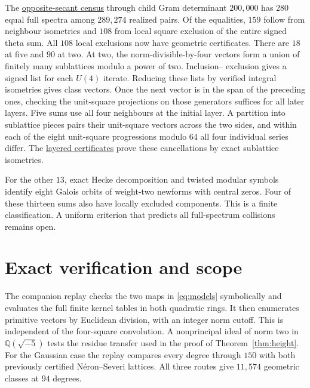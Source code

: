 \documentclass[11pt,letterpaper]{amsart}
\theoremstyle{definition}
\numberwithin{equation}{section}
\newcommand{\Q}{\mathbb Q}
\begin{document}
The \href{https://github.com/towre676-cloud/crest-root-calculus/blob/main/research/elliptic-quotients/opposite-secant-spectra/delay/README.md}{opposite-secant census}
through child Gram determinant \(200{,}000\) has \(280\) equal full
spectra among \(289{,}274\) realized pairs. Of the equalities,
\(159\) follow from neighbour isometries and \(108\) from local
square exclusion of the entire signed theta sum. All \(108\) local
exclusions now have geometric certificates. There are \(18\) at five
and \(90\) at two. At two, the norm-divisible-by-four vectors form a
union of finitely many sublattices modulo a power of two. Inclusion--
exclusion gives a signed list for each \(U(4)\) iterate. Reducing these
lists by verified integral isometries gives class vectors. Once the
next vector is in the span of the preceding ones, checking the
unit-square projections on those generators suffices for all later
layers. Five sums use all four neighbours at the initial layer. A
partition into sublattice pieces pairs their unit-square vectors
across the two sides, and within each of the eight unit-square
progressions modulo \(64\) all four individual series differ.
The \href{https://github.com/towre676-cloud/crest-root-calculus/blob/main/research/elliptic-quotients/opposite-secant-spectra/delay/local-geometry.md#all-valuation-layers-at-two}{layered certificates} prove these cancellations by exact
sublattice isometries.

For the other \(13\), exact Hecke decomposition and twisted modular symbols
identify eight Galois orbits of weight-two newforms with central
zeros. Four of these thirteen sums also have locally excluded
components. This is a finite classification. A uniform criterion
that predicts all full-spectrum collisions remains open.

\section{Exact verification and scope}

The companion replay checks the two maps in \eqref{eq:models}
symbolically and evaluates the full finite kernel tables in both
quadratic rings. It then enumerates primitive vectors by Euclidean
division, with an integer norm cutoff. This is independent of the
four-square convolution. A nonprincipal ideal of norm two in
\(\Q(\sqrt{-5})\) tests the residue transfer used in the proof of
Theorem~\ref{thm:height}. For the Gaussian case the replay compares
every degree through \(150\) with both previously certified
N\'eron--Severi lattices. All three routes give \(11{,}574\)
geometric classes at \(94\) degrees.
\end{document}
